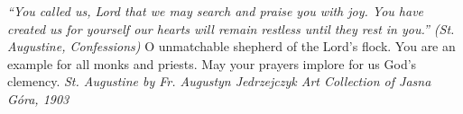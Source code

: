 \pagestyle{empty}
\hspace{0pt}
\vfill

\textit{``You called us, Lord that we may search and praise you
with joy. You have created us for yourself our hearts will remain
restless until they rest in you.'' (St. Augustine, Confessions)}
\medbreak
O unmatchable shepherd of the Lord's flock. You are an
example for all monks and priests. May your prayers implore for us
God's clemency.
\vfill
\textit{St. Augustine by Fr. Augustyn Jedrzejczyk Art Collection of Jasna
Góra, 1903}
\hspace{0pt}
\newpage
